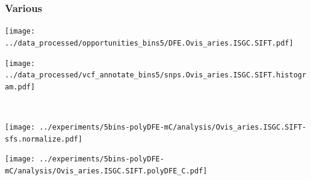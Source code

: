 \subsubsection{Various}

\begin{minipage}{0.49\linewidth}
    \texttt{[image: ../data\_processed/opportunities\_bins5/DFE.Ovis\_aries.ISGC.SIFT.pdf]}
\end{minipage}
\begin{minipage}{0.49\linewidth}
    \texttt{[image: ../data\_processed/vcf\_annotate\_bins5/snps.Ovis\_aries.ISGC.SIFT.histogram.pdf]}
\end{minipage}
\\
\begin{minipage}{0.49\linewidth}
    \texttt{[image: ../experiments/5bins-polyDFE-mC/analysis/Ovis\_aries.ISGC.SIFT-sfs.normalize.pdf]}
\end{minipage}
\begin{minipage}{0.4\linewidth}
    \texttt{[image: ../experiments/5bins-polyDFE-mC/analysis/Ovis\_aries.ISGC.SIFT.polyDFE\_C.pdf]}
\end{minipage}

